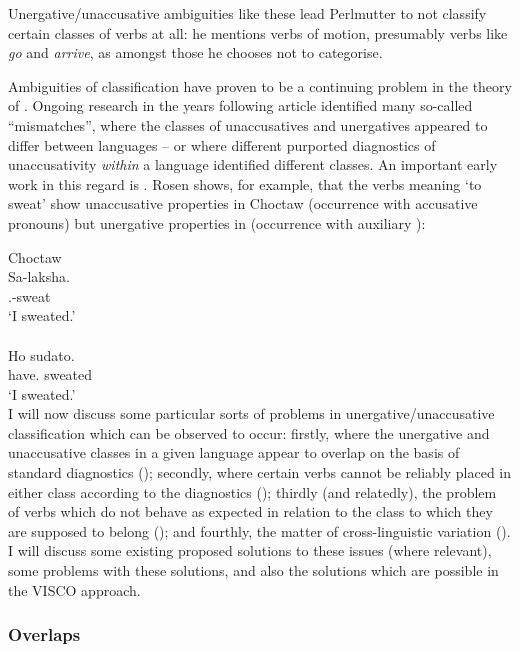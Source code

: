 \documentclass[output=paper]{langsci/langscibook}
\begin{document}
Unergative/unaccusative ambiguities like these lead Perlmutter to not classify
certain classes of verbs at all: he mentions verbs of motion, presumably verbs
like \emph{go} and \emph{arrive}, as amongst those he chooses not to
categorise.

Ambiguities of classification have proven to be a continuing problem in the
theory of . Ongoing research in the years following
 article identified many so-called \enquote{mismatches},
where the classes of unaccusatives and unergatives appeared to differ between
languages – or where different purported diagnostics of unaccusativity
\emph{within} a language identified different classes. An important early
work in this regard is \citet{Rosen1984}. Rosen shows, for example, that the
verbs meaning `to sweat' show unaccusative properties in Choctaw
(occurrence with accusative pronouns) but unergative properties in 
(occurrence with auxiliary \HAVE):

\ea Choctaw \parencite[62]{Rosen1984}\\
    \gll Sa-laksha.\\
    \Fsg.\Acc-sweat\\
    \glt \enquote*{I sweated.}\\
\ex  {} \parencite[62]{Rosen1984}\\
    \gll Ho sudato.\\
    have.\Fsg{} sweated\\
    \glt \enquote*{I sweated.}\\
\z
I will now discuss some particular sorts of problems in unergative/unaccusative
classification which can be observed to occur: firstly, where the unergative
and unaccusative classes in a given language appear to overlap on the basis of
standard diagnostics (); secondly, where certain verbs cannot be reliably
placed in either class according to the diagnostics (); thirdly (and
relatedly), the problem of verbs which do not behave as expected in relation to
the class to which they are supposed to belong (); and fourthly, the
matter of cross-linguistic variation (). I will discuss some existing
proposed solutions to these issues (where relevant), some problems with these
solutions, and also the solutions which are possible in the VISCO approach.

\subsubsection{Overlaps}\label{sec:baker:3.4.3}
\end{document}
